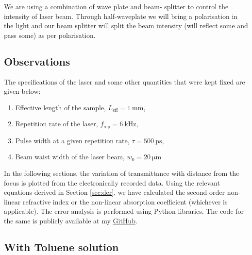 \documentclass[%
 reprint,
 amsmath,amssymb,
 aps,
]{revtex4-2}
\begin{document}
	We are using a combination of wave plate and beam-
	splitter to control the intensity of laser beam.
	Through
	half-waveplate we will bring a
	polarisation in the light and
	our beam splitter will split
	the beam intensity (will reflect
	some and pass some) as per polarisation.
	\subsection{Observations}
	The specifications of the laser and some other quantities that were kept fixed are given below:
	\begin{enumerate}
		\item Effective length of the sample, $ L_{\mathrm{eff}} = \SI{1}{\milli \meter} $,
		\item Repetition rate of the laser, $ f_{\mathrm{rep}} = \SI{6}{\kilo \hertz}$,
		\item Pulse width at a given repetition rate, $ \tau = \SI{500}{\pico \second} $,
		\item Beam waist width of the laser beam, $ w_0 = \SI{20}{\micro \meter} $
	\end{enumerate}
	\par 
	In the following sections, the variation of transmittance with distance from the focus is plotted from the electronically recorded data. Using the relevant equations derived in Section \ref{sec:der}, we have calculated the second order non-linear refractive index or the non-linear absorption coefficient (whichever is applicable). The error analysis is performed using Python libraries. The code for the same is publicly available at my \href{https://github.com/peakcipher/coursework/tree/master/22O1}{GitHub}.
	
	
	\subsection{With Toluene solution}
\end{document}
